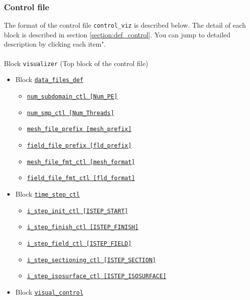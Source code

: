 \subsubsection{Control file}
The format of the control file \verb|control_viz| is described below. The detail of each block is described in section \ref{section:def_control}. You can jump to detailed description by clicking each item". \\
\\
%
Block \verb|visualizer|  (Top block of the control file)
\label{href_i:visualizer}
%
\begin{itemize}
\item Block \hyperref[href_t:data_files_def]{\tt data\_files\_def}
	\label{href_i:data_files_def_v}
%
	\begin{itemize}
	\item \hyperref[href_t:num_subdomain_ctl]
			{\tt num\_subdomain\_ctl    [Num\_PE]}
	\item \hyperref[href_t:num_smp_ctl]
			{\tt num\_smp\_ctl    [Num\_Threads]}
	\item \hyperref[href_t:mesh_file_prefix]
			{\tt mesh\_file\_prefix    [mesh\_prefix]}
	\item \hyperref[href_t:field_file_prefix]
			{\tt field\_file\_prefix    [fld\_prefix]}
%
	\item \hyperref[href_t:mesh_file_fmt_ctl]
			{\tt mesh\_file\_fmt\_ctl    [mesh\_format]}
	\item \hyperref[href_t:field_file_fmt_ctl]
			{\tt field\_file\_fmt\_ctl    [fld\_format]}
	\end{itemize}
%
\item Block \hyperref[href_t:time_step_ctl]{\tt time\_step\_ctl}
	\begin{itemize} \label{href_i:time_step_ctl_v}
	\item \hyperref[href_t:i_step_init_ctl]
		{\tt i\_step\_init\_ctl        [ISTEP\_START]}
	\item \hyperref[href_t:i_step_finish_ctl]
		{\tt i\_step\_finish\_ctl      [ISTEP\_FINISH]}
	\item \hyperref[href_t:i_step_field_ctl]
		{\tt i\_step\_field\_ctl       [ISTEP\_FIELD]}
	\item \hyperref[href_t:i_step_sectioning_ctl]
		{\tt i\_step\_sectioning\_ctl  [ISTEP\_SECTION]}
	\item \hyperref[href_t:i_step_isosurface_ctl]
		{\tt i\_step\_isosurface\_ctl  [ISTEP\_ISOSURFACE]}
	\end{itemize}
%
\item Block \hyperref[href_t:visual_control]{\tt visual\_control}

\end{itemize}
